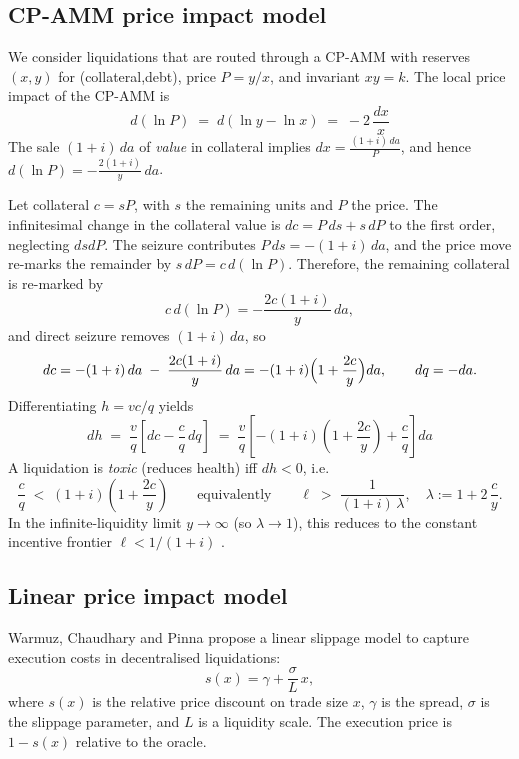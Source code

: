 \documentclass[11pt]{article}
\begin{document}
\subsection{CP-AMM price impact model}
We consider liquidations that are routed through a CP-AMM with reserves \((x,y)\) for (collateral,debt), price \(P=y/x\), and invariant \(xy=k\). The local price impact of the CP-AMM is
\begin{equation}
d(\ln P) \;=\; d(\ln y - \ln x) \;=\; -2\,\frac{dx}{x}
\label{eq:cp-impact}
\end{equation}
The sale \((1+i)\,da\) of \emph{value} in collateral implies \(dx = \frac{(1+i)\,da}{P}\), and hence \(d(\ln P) = -\frac{2(1+i)}{y}\,da\).

Let collateral $c=sP$, with $s$ the remaining units and $P$ the price. The infinitesimal change in the collateral value is $dc = P\,ds + s\,dP$ to the first order, neglecting $dsdP$. The seizure contributes $P\,ds=-(1+i)\,da$, and the price move re-marks the remainder by $s\,dP=c\,d(\ln P)$. Therefore, the remaining collateral is re-marked by
\[
c\,d(\ln P) = -\frac{2c(1+i)}{y}\,da,
\]
and direct seizure removes \((1+i)\,da\), so
\[
dc = - (1+i)\,da \;-\; \frac{2c(1+i)}{y}\,da
= -(1+i)\Bigl(1+\frac{2c}{y}\Bigr)da,
\qquad dq=-da.
\]
Differentiating \(h = v c/q\) yields
\[
dh \;=\; \frac{v}{q}\!\left[dc - \frac{c}{q}\,dq\right]
\;=\; \frac{v}{q}\!\left[-(1+i)\!\left(1+\frac{2c}{y}\right) + \frac{c}{q}\right]\!da
\]
A liquidation is \emph{toxic} (reduces health) iff \(dh<0\), i.e.
\begin{equation}
\frac{c}{q} \;\lt\; (1+i)\!\left(1+\frac{2c}{y}\right)
\qquad\text{equivalently}\qquad
\ell \;\gt\; \frac{1}{(1+i)\,\lambda},
\quad \lambda := 1 + 2\,\frac{c}{y}.
\label{eq:constant-bonus}
\end{equation}
In the infinite-liquidity limit \(y\to\infty\) (so \(\lambda\to 1\)), this reduces to the constant incentive frontier \(\ell < 1/(1+i)\) \cite{WCP2022}.

\subsection{Linear price impact model}
Warmuz, Chaudhary and Pinna \cite{WCP2022} propose a linear slippage model to capture execution costs in decentralised liquidations:
\[
s(x) = \gamma + \frac{\sigma}{L}\,x,
\]
where $s(x)$ is the relative price discount on trade size $x$, $\gamma$ is the spread, $\sigma$ is the slippage parameter, and $L$ is a liquidity scale. The execution price is $1-s(x)$ relative to the oracle.
\end{document}
